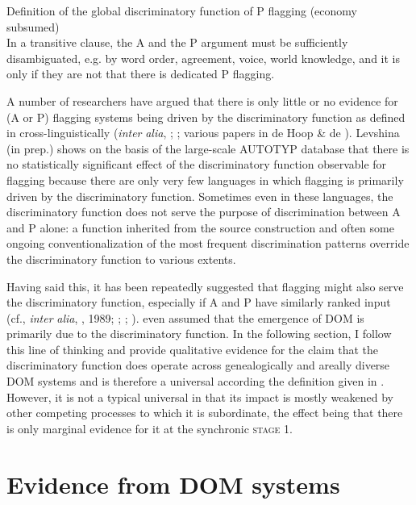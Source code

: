 \documentclass[output=paper]{langsci/langscibook}
\begin{document}
\ea\label{ex:serzant:}
Definition of the global discriminatory function of P flagging (economy subsumed)\\
In a transitive clause, the A and the P argument must be sufficiently disambiguated, e.g. by word order, agreement, voice, world knowledge, and it is only if they are not that there is dedicated P flagging.\\
\z

A number of researchers have argued that there is only little or no evidence for (A or P) flagging systems being driven by the discriminatory function as defined in  cross-linguistically (\textit{inter} \textit{alia}, \citealt{Aissen2003}; \citealt{Malchukov2008}; various papers in de Hoop \& de \citealt{Swart2008}). Levshina (in prep.) shows on the basis of the large-scale AUTOTYP database that there is no statistically significant effect of the discriminatory function observable for flagging because there are only very few languages in which flagging is primarily driven by the discriminatory function. Sometimes even in these languages, the discriminatory function does not serve the purpose of discrimination between A and P alone: a function inherited from the source construction and often some ongoing conventionalization of the most frequent discrimination patterns override the discriminatory function to various extents. 

Having said this, it has been repeatedly suggested that flagging might also serve the discriminatory function, especially if A and P have similarly ranked input (cf., \textit{inter} \textit{alia}, \citealt{Comrie1978}, 1989; \citealt{Dixon1994}; \citealt{Silverstein1976}; \citealt{Kibrik1997}). \citet[117]{Bossong1985} even assumed that the emergence of DOM is primarily due to the discriminatory function. In the following section, I follow this line of thinking and provide qualitative evidence for the claim that the discriminatory function does operate across genealogically and areally diverse DOM systems and is therefore a universal according the definition given in . However, it is not a typical universal in that its impact is mostly weakened by other competing processes to which it is subordinate, the effect being that there is only marginal evidence for it at the synchronic \textsc{stage} 1.

\section{ Evidence from DOM systems}
\end{document}
